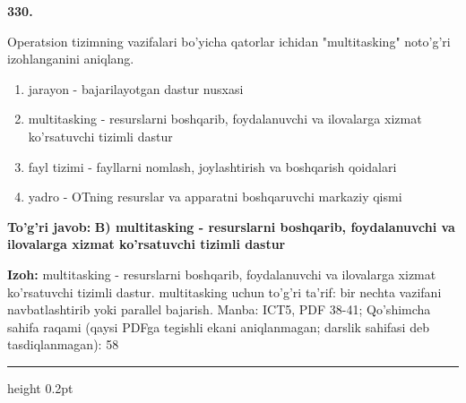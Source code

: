 \documentclass[10pt,a4paper]{article}
\begin{document}
{\bfseries\sffamily\color{ink} 330.}
\par
Operatsion tizimning vazifalari bo'yicha qatorlar ichidan "multitasking" noto'g'ri izohlanganini aniqlang.
\begin{enumerate}[label=\Alph*),leftmargin=9mm]
\item jarayon - bajarilayotgan dastur nusxasi
\item multitasking - resurslarni boshqarib, foydalanuvchi va ilovalarga xizmat ko'rsatuvchi tizimli dastur
\item fayl tizimi - fayllarni nomlash, joylashtirish va boshqarish qoidalari
\item yadro - OTning resurslar va apparatni boshqaruvchi markaziy qismi
\end{enumerate}
\begin{tcolorbox}[enhanced,breakable,colback=teal!4,colframe=teal!60!black,boxrule=0.45pt,arc=1.2mm,left=2.7mm,right=2.7mm,top=1.8mm,bottom=1.8mm,before skip=2mm,after skip=2mm]
{\bfseries\sffamily\color{teal}To'g'ri javob:} \textbf{B) multitasking - resurslarni boshqarib, foydalanuvchi va ilovalarga xizmat ko'rsatuvchi tizimli dastur}
\par\smallskip
{\bfseries Izoh:} multitasking - resurslarni boshqarib, foydalanuvchi va ilovalarga xizmat ko'rsatuvchi tizimli dastur. multitasking uchun to'g'ri ta'rif: bir nechta vazifani navbatlashtirib yoki parallel bajarish. Manba: ICT5, PDF 38-41; Qo'shimcha sahifa raqami (qaysi PDFga tegishli ekani aniqlanmagan; darslik sahifasi deb tasdiqlanmagan): 58
\end{tcolorbox}
\vspace{2mm}\hrule height 0.2pt\vspace{3mm}
\end{document}
